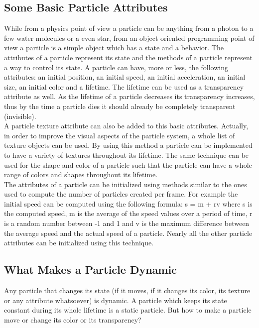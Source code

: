 \newpage
\subsection{Some Basic Particle Attributes}
While from a physics point of view a particle can be anything from a photon to a few water molecules or a even star, from an object oriented programming point of view a particle is a simple object which has a state and a behavior. The attributes of a particle represent its state and the methods of a particle represent a way to control its state. A particle can have, more or less, the following attributes: an initial position, an initial speed, an initial acceleration, an initial size, an initial color and a lifetime. The lifetime can be used as a transparency attribute as well. As the lifetime of a particle decreases its transparency increases, thus by the time a particle dies it should already be completely transparent (invisible).\\

A particle texture attribute can also be added to this basic attributes. Actually, in order to improve the visual aspects of the particle system, a whole list of texture objects can be used. By using this method a particle can be implemented to have a variety of textures throughout its lifetime. The same technique can be used for the shape and color of a particle such that the particle can have a whole range of colors and shapes throughout its lifetime.\\

The attributes of a particle can be initialized using methods similar to the ones used to compute the number of particles created per frame. For example the initial speed can be computed using the following formula: s = m + rv where s is the computed speed, m is the average of the speed values over a period of time, r is a random number between -1 and 1 and v is the maximum difference between the average speed and the actual speed of a particle. Nearly all the other particle attributes can be initialized using this technique.\\

\newpage
\subsection{What Makes a Particle Dynamic}
Any particle that changes its state (if it moves, if it changes its color, its texture or any attribute whatsoever) is dynamic. A particle which keeps its state constant during its whole lifetime is a static particle. But how to make a particle move or change its color or its transparency?\\

